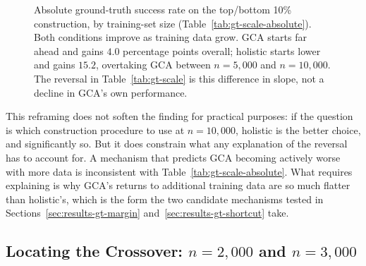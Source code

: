 \begin{figure}[htbp]
\centering
{}
\caption[Absolute ground-truth success rate by training-set size]{Absolute ground-truth success rate on the top/bottom 10\%
construction, by training-set size (Table~\ref{tab:gt-scale-absolute}).
Both conditions improve as training data grow. GCA starts far ahead and
gains $4.0$ percentage points overall; holistic starts lower and gains
$15.2$, overtaking GCA between $n=5{,}000$ and $n=10{,}000$. The reversal
in Table~\ref{tab:gt-scale} is this difference in slope, not a decline in
GCA's own performance.}
\label{fig:gt-absolute-crossing}
\end{figure}

This reframing does not soften the finding for practical purposes: if the
question is which construction procedure to use at $n=10{,}000$, holistic
is the better choice, and significantly so. But it does constrain what any
explanation of the reversal has to account for. A mechanism that predicts
GCA becoming actively worse with more data is inconsistent with
Table~\ref{tab:gt-scale-absolute}. What requires explaining is why GCA's
returns to additional training data are so much flatter than holistic's,
which is the form the two candidate mechanisms tested in
Sections~\ref{sec:results-gt-margin} and~\ref{sec:results-gt-shortcut} take.

\subsection{Locating the Crossover: \texorpdfstring{$n=2{,}000$}{n=2,000} and \texorpdfstring{$n=3{,}000$}{n=3,000}}
\label{sec:results-scale-curve}

